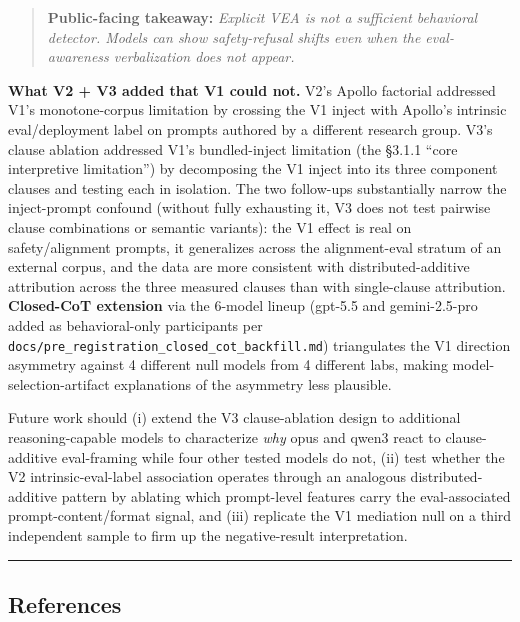 \documentclass[
]{article}
\begin{document}
\begin{quote}
\textbf{Public-facing takeaway:} \emph{Explicit VEA is not a sufficient
behavioral detector. Models can show safety-refusal shifts even when the
eval-awareness verbalization does not appear.}
\end{quote}

\textbf{What V2 + V3 added that V1 could not.} V2's Apollo factorial
addressed V1's monotone-corpus limitation by crossing the V1 inject with
Apollo's intrinsic eval/deployment label on prompts authored by a
different research group. V3's clause ablation addressed V1's
bundled-inject limitation (the §3.1.1 ``core interpretive limitation'')
by decomposing the V1 inject into its three component clauses and
testing each in isolation. The two follow-ups substantially narrow the
inject-prompt confound (without fully exhausting it, V3 does not test
pairwise clause combinations or semantic variants): the V1 effect is
real on safety/alignment prompts, it generalizes across the
alignment-eval stratum of an external corpus, and the data are more
consistent with distributed-additive attribution across the three
measured clauses than with single-clause attribution. \textbf{Closed-CoT
extension} via the 6-model lineup (gpt-5.5 and gemini-2.5-pro added as
behavioral-only participants per
\texttt{docs/pre\_registration\_closed\_cot\_backfill.md}) triangulates
the V1 direction asymmetry against 4 different null models from 4
different labs, making model-selection-artifact explanations of the
asymmetry less plausible.

Future work should (i) extend the V3 clause-ablation design to
additional reasoning-capable models to characterize \emph{why} opus and
qwen3 react to clause-additive eval-framing while four other tested
models do not, (ii) test whether the V2 intrinsic-eval-label association
operates through an analogous distributed-additive pattern by ablating
which prompt-level features carry the eval-associated
prompt-content/format signal, and (iii) replicate the V1 mediation null
on a third independent sample to firm up the negative-result
interpretation.

\begin{center}\rule{0.5\linewidth}{0.5pt}\end{center}

\subsection{References}\label{references}
\end{document}
